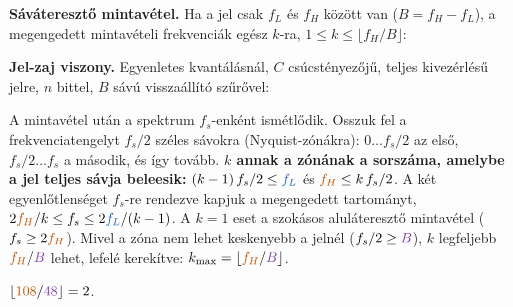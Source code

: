 \begin{elmelet}
\textbf{Sáváteresztő mintavétel.} Ha a jel csak $f_L$ és $f_H$ között van ($B=f_H-f_L$), a megengedett mintavételi frekvenciák egész $k$-ra, $1\le k\le\lfloor f_H/B\rfloor$:
\begin{center}\end{center}


\textbf{Jel-zaj viszony.} Egyenletes kvantálásnál, $C$ csúcstényezőjű, teljes kivezérlésű jelre, $n$ bittel, $B$ sávú visszaállító szűrővel:
\begin{center}\end{center}

\end{elmelet}

A mintavétel után a spektrum $f_s$-enként ismétlődik. Osszuk fel a frekvenciatengelyt $f_s/2$ széles sávokra (Nyquist-zónákra): $0\ldots f_s/2$ az első, $f_s/2\ldots f_s$ a második, és így tovább. \textbf{$k$ annak a zónának a sorszáma, amelybe a jel teljes sávja beleesik:} $(k-1)\,f_s/2\le {\ca{f_L}}$ és ${\cb{f_H}}\le k\,f_s/2$. A két egyenlőtlenséget $f_s$-re rendezve kapjuk a megengedett tartományt, $2{\cb{f_H}}/k\le f_s\le2{\ca{f_L}}/(k-1)$. A $k=1$ eset a szokásos aluláteresztő mintavétel ($f_s\ge2{\cb{f_H}}$). Mivel a zóna nem lehet keskenyebb a jelnél ($f_s/2\ge {\cc{B}}$), $k$ legfeljebb ${\cb{f_H}}/{\cc{B}}$ lehet, lefelé kerekítve: $k_{\max}=\lfloor {\cb{f_H}}/{\cc{B}}\rfloor$.

$\lfloor{\cb{108}}/{\cc{48}}\rfloor=2$.

\begin{center}\end{center}

\begin{center}\end{center}

\begin{center}\end{center}


